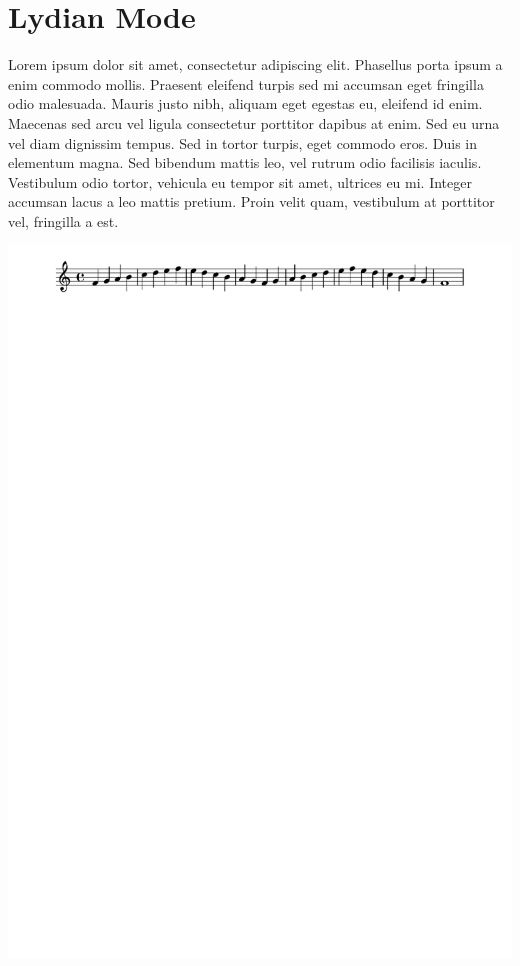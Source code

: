 \documentclass[11pt]{article}
\begin{document}
\section*{Lydian Mode}
\label{sec:org2808c24}

Lorem ipsum dolor sit amet, consectetur adipiscing elit. Phasellus
porta ipsum a enim commodo mollis. Praesent eleifend turpis sed mi
accumsan eget fringilla odio malesuada. Mauris justo nibh, aliquam
eget egestas eu, eleifend id enim. Maecenas sed arcu vel ligula
consectetur porttitor dapibus at enim. Sed eu urna vel diam dignissim
tempus. Sed in tortor turpis, eget commodo eros. Duis in elementum
magna. Sed bibendum mattis leo, vel rutrum odio facilisis iaculis.
Vestibulum odio tortor, vehicula eu tempor sit amet, ultrices eu mi.
Integer accumsan lacus a leo mattis pretium. Proin velit quam,
vestibulum at porttitor vel, fringilla a est.

\begin{center}
\includegraphics[width=.9\linewidth]{lydian.pdf}
\end{center}
\end{document}
